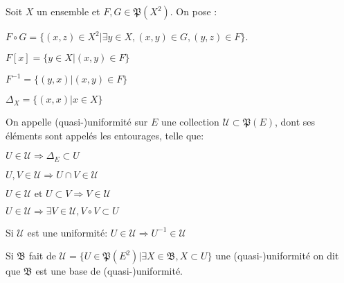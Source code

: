 \documentclass[a4paper, 11pt, french]{book}
\newenvironment{itemise}{\itemize}{\enditemize}
\theoremstyle{plain} %
\theoremstyle{definition} %
\theoremstyle{remark} %
\newcommand{\1}{\mathds{1}}
\newcommand{\inv}[1]{#1^{-1}}
\newcommand\et{\text{ et }}
\begin{document}
Soit $X$ un ensemble et $F, G\in\mathfrak{P}(X^2)$.
On pose :
\begin{itemise}
	\item $F\circ G=\{(x, z)\in X^2 | \exists y\in X, (x, y)\in G, (y, z)\in F\}$.
	\item $F[x]=\{y\in X | (x, y)\in F\}$
	\item $\inv{F}=\{(y, x) | (x, y)\in F\}$
	\item $\Delta_X=\{(x, x) | x\in X\}$
\end{itemise}

On appelle (quasi-)uniformité sur $E$ une collection $\mathscr{U}\subset\mathfrak{P}(E)$, dont ses éléments sont appelés les entourages, telle que:
\begin{itemise}
	\item $U\in\mathscr{U}\Rightarrow\Delta_E\subset U$
	\item $U, V\in\mathscr{U}\Rightarrow U\cap V\in\mathscr{U}$
	\item $U\in\mathscr{U}\et U\subset V\Rightarrow V\in\mathscr{U}$
	\item $U\in\mathscr{U}\Rightarrow\exists V\in\mathscr{U}, V\circ V\subset U$
	\item Si $\mathscr{U}$ est une uniformité: $U\in\mathscr{U}\Rightarrow\inv{U}\in\mathscr{U}$
\end{itemise}

Si $\mathfrak{B}$ fait de $\mathscr{U}=\{U\in\mathfrak{P}(E^2) | \exists X\in\mathfrak{B}, X\subset U\}$ une (quasi-)uniformité on dit que $\mathfrak{B}$ est une base de (quasi-)uniformité.
\end{document}
